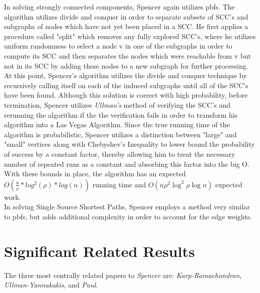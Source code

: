 \documentclass[paper=a4, fontsize=11pt]{scrartcl} %
\numberwithin{equation}{section} %
\numberwithin{figure}{section} %
\numberwithin{table}{section} %
\begin{document}
In solving strongly connected components, Spencer again utilizes pbfs. The algorithm utilizes divide and conquer in order to separate subsets of SCC's and subgraphs of nodes which have not yet been placed in a SCC. He first applies a procedure called "split" which removes any fully explored SCC's, where he utilizes uniform randomness to select a node v in one of the subgraphs in order to compute its SCC and then separates the nodes which were reachable from v but not in its SCC by adding these nodes to a new subgraph for further processing. At this point, Spencer's algorithm utilizes the divide and conquer technique by recursively calling itself on each of the induced subgraphs until all of the SCC's have been found. Although this solution is correct with high probability, before termination, Spencer utilizes \textit{Ullman's\cite{UY91}} method of verifying the SCC's and rerunning the algorithm if the the verification fails in order to transform his algorithm into a Las Vegas Algorithm. Since the true running time of the algorithm is probabilistic, Spencer utilizes a distinction between "large" and "small" vertices along with Chebyshev's Inequality to lower bound the probability of success by a constant factor, thereby allowing him to treat the necessary number of repeated runs as a constant and absorbing this factor into the big O. With these bounds in place, the algorithm has an expected $O(\frac{n}{\rho}*log^2(\rho)*log(n))$ running time and $O(n\rho^2\log^2{\rho}\log{n})$ expected work.  \\ 

In solving Single Source Shortest Paths, Spencer employs a method very similar to pbfs, but adds additional complexity in order to account for the edge weights. 


\section{Significant Related Results}

The three most centrally related papers to \textit{Spencer\cite{S97}} are:  \textit{Karp-Ramachandran\cite{KR90}}, \textit{Ullman-Yannakakis\cite{UY91}}, and \textit{Paul\cite{P83}}.
\end{document}
